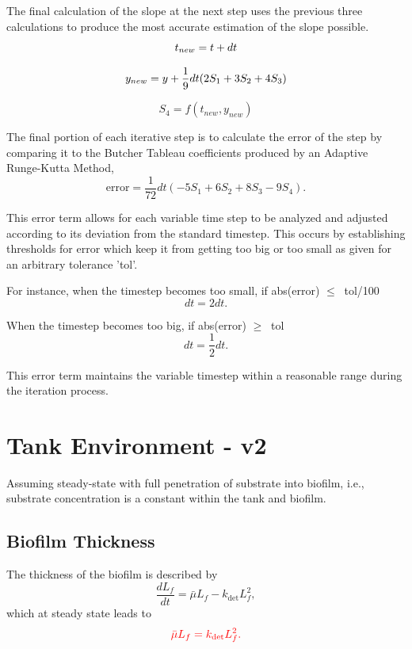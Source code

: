 \documentclass[letterpaper, twoside]{article}
\numberwithin{equation}{section}
\newcommand{\ie}{i.e.}
\begin{document}
The final calculation of the slope at the next step uses the previous three calculations to produce the most accurate estimation of the slope possible. 
\begin{equation} \label{eq: t_{new}}
  t_{new} = t + dt
\end{equation}

\begin{equation} \label{eq: y_{new}}
  y_{new} = y + \frac{1}{9} dt (2 S_1 + 3 S_2 + 4 S_3)
\end{equation}

\begin{equation} \label{eq: S_4}
  S_4 = f(t_{new},y_{new})
\end{equation}

The final portion of each iterative step is to calculate the error of the step by comparing it to the Butcher Tableau coefficients produced by an Adaptive Runge-Kutta Method,
\begin{equation} \label{eq: errorfunction}
  \mathrm{error} = \frac{1}{72} dt (-5 S_1 + 6 S_2 + 8 S_3 - 9 S_4).
\end{equation}

This error term allows for each variable time step to be analyzed and adjusted according to its deviation from the standard timestep. This occurs by establishing thresholds for error which keep it from getting too big or too small as given for an arbitrary tolerance 'tol'.

For instance, when the timestep becomes too small,  if abs(error) $ \leq\ $ tol/100
\begin{equation}
  dt = 2 dt.
\end{equation}

When the timestep becomes too big, if abs(error) $ \geq\ $ tol
\begin{equation}
  dt = \frac{1}{2} dt.
\end{equation}

This error term maintains the variable timestep within a reasonable range during the iteration process.


\section{Tank Environment - v2}
Assuming steady-state with full penetration of substrate into biofilm, \ie, substrate concentration is a constant within the tank and biofilm.
\subsection{Biofilm Thickness}
The thickness of the biofilm is described by
\begin{equation}
  \frac{d L_f}{dt} = {\bar\mu L_f}-{k_{\mathrm{det}}L_f^2},
\end{equation}
which at steady state leads to
\begin{equation}\label{eq:Lfsteady}
{\color{red}
  {\bar\mu L_f}={k_{\mathrm{det}}L_f^2}.
}
\end{equation}
\end{document}
